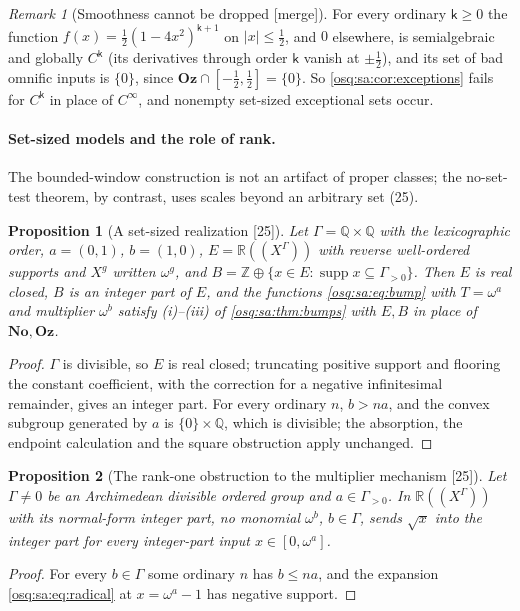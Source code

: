 \documentclass[11pt,letterpaper]{article}
\numberwithin{equation}{section}
\newtheorem{proposition}[proposition]{Proposition}
\theoremstyle{definition}
\theoremstyle{remark}
\newtheorem{remark}[remark]{Remark}
\theoremstyle{plain}
\newcommand{\No}{\mathbf{No}}
\newcommand{\Oz}{\mathbf{Oz}}
\newcommand{\Z}{\mathbb Z}
\newcommand{\Q}{\mathbb Q}
\newcommand{\R}{\mathbb R}
\newcommand{\hahn}[2]{#1(\!(X^{#2})\!)}
\newcommand{\supp}{\operatorname{supp}}
\newcommand{\src}[1]{\textup{\textsf{[#1]}}}
\newcommand{\merge}{\textup{\textsf{[merge]}}}
\begin{document}
\begin{remark}[Smoothness cannot be dropped \merge]\label{osq:sa:rem:exceptionsnecessary}
For every ordinary $\mathsf k\ge0$ the function $f(x)=\frac12(1-4x^2)^{\mathsf k+1}$ on $|x|\le\frac12$, and $0$ elsewhere, is semialgebraic and globally
$C^{\mathsf k}$ (its derivatives through order $\mathsf k$ vanish at $\pm\frac12$), and its set of bad omnific inputs is $\{0\}$, since $\Oz\cap
[-\frac12,\frac12]=\{0\}$. So \cref{osq:sa:cor:exceptions} fails for $C^{\mathsf k}$ in place of $C^\infty$, and nonempty set-sized exceptional sets occur.
\end{remark}

\paragraph{Set-sized models and the role of rank.} The bounded-window construction is not an artifact of proper classes; the no-set-test theorem, by
contrast, uses scales beyond an arbitrary set (25).

\begin{proposition}[A set-sized realization \src{25}]\label{osq:sa:prop:setmodel}
Let $\Gamma=\Q\times\Q$ with the lexicographic order, $a=(0,1)$, $b=(1,0)$, $E=\hahn\R\Gamma$ with reverse well-ordered supports and $X^g$ written
$\omega^g$, and $B=\Z\oplus\{x\in E:\supp x\subseteq\Gamma_{>0}\}$. Then $E$ is real closed, $B$ is an integer part of $E$, and the functions
\eqref{osq:sa:eq:bump} with $T=\omega^a$ and multiplier $\omega^b$ satisfy (i)--(iii) of \cref{osq:sa:thm:bumps} with $E,B$ in place of $\No,\Oz$.
\end{proposition}
\begin{proof}
$\Gamma$ is divisible, so $E$ is real closed; truncating positive support and flooring the constant coefficient, with the correction for a negative
infinitesimal remainder, gives an integer part. For every ordinary $n$, $b>na$, and the convex subgroup generated by $a$ is $\{0\}\times\Q$, which is
divisible; the absorption, the endpoint calculation and the square obstruction apply unchanged.
\end{proof}

\begin{proposition}[The rank-one obstruction to the multiplier mechanism \src{25}]\label{osq:sa:prop:rankone}
Let $\Gamma\ne0$ be an Archimedean divisible ordered group and $a\in\Gamma_{>0}$. In $\hahn\R\Gamma$ with its normal-form integer part, no monomial
$\omega^b$, $b\in\Gamma$, sends $\sqrt x$ into the integer part for every integer-part input $x\in[0,\omega^a]$.
\end{proposition}
\begin{proof}
For every $b\in\Gamma$ some ordinary $n$ has $b\le na$, and the expansion \eqref{osq:sa:eq:radical} at $x=\omega^a-1$ has negative support.
\end{proof}
\end{document}
